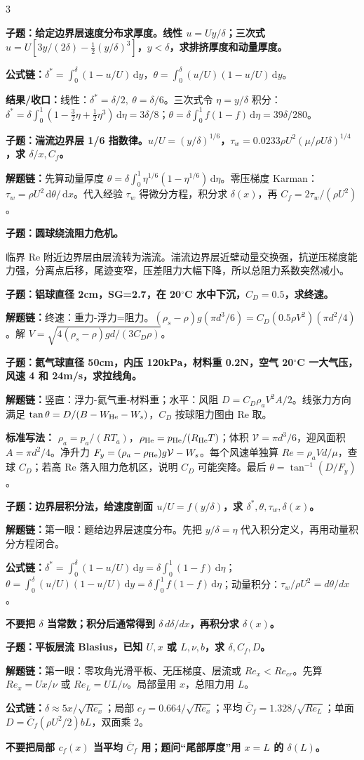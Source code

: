 \documentclass[a4paper]{article}
\newcommand{\qt}[1]{\vspace{0.04pt}\colorbox{Q}{\parbox{\dimexpr\linewidth-2\fboxsep}{\color{white}\bfseries #1}}\par}
\newcommand{\ans}[1]{\colorbox{G}{\parbox{\dimexpr\linewidth-2\fboxsep}{#1}}\par}
\newcommand{\warn}[1]{\colorbox{Y}{\parbox{\dimexpr\linewidth-2\fboxsep}{\color{E}\bfseries #1}}\par}
\newcommand{\chain}[1]{{\color{A}\bfseries 解题链：}#1\par}
\newcommand{\res}[1]{{\color{E}\bfseries 结果/收口：}#1\par}
\newcommand{\form}[1]{{\color{M}\bfseries 公式链：}#1\par}
\newcommand{\dd}{\,\mathrm d}
\begin{document}
\begin{multicols}{3}
\qt{子题：给定边界层速度分布求厚度。线性 $u=Uy/\delta$；三次式 $u=U[3y/(2\delta)-\frac12(y/\delta)^3]$，$y<\delta$，求排挤厚度和动量厚度。}
\form{$\delta^*=\int_0^\delta(1-u/U)\dd y$，$\theta=\int_0^\delta(u/U)(1-u/U)\dd y$。}
\res{线性：$\delta^*=\delta/2,\ \theta=\delta/6$。三次式令 $\eta=y/\delta$ 积分：$\delta^*=\delta\int_0^1(1-\frac32\eta+\frac12\eta^3)\dd\eta=3\delta/8$；$\theta=\delta\int_0^1 f(1-f)\dd\eta=39\delta/280$。}

\qt{子题：湍流边界层 1/6 指数律。$u/U=(y/\delta)^{1/6}$，$\tau_w=0.0233\rho U^2(\mu/\rho U\delta)^{1/4}$，求 $\delta/x,C_f$。}
\chain{先算动量厚度 $\theta=\delta\int_0^1\eta^{1/6}(1-\eta^{1/6})\dd\eta$。零压梯度 Karman：$\tau_w=\rho U^2\dd\theta/\dd x$。代入经验 $\tau_w$ 得微分方程，积分求 $\delta(x)$，再 $C_f=2\tau_w/(\rho U^2)$。}

\qt{子题：圆球绕流阻力危机。}
\ans{临界 Re 附近边界层由层流转为湍流。湍流边界层近壁动量交换强，抗逆压梯度能力强，分离点后移，尾迹变窄，压差阻力大幅下降，所以总阻力系数突然减小。}

\qt{子题：铝球直径 2cm，SG=2.7，在 20$^\circ$C 水中下沉，$C_D=0.5$，求终速。}
\chain{终速：重力-浮力=阻力。$(\rho_s-\rho)g(\pi d^3/6)=C_D(0.5\rho V^2)(\pi d^2/4)$。解 $V=\sqrt{4(\rho_s-\rho)gd/(3C_D\rho)}$。}

\qt{子题：氦气球直径 50cm，内压 120kPa，材料重 0.2N，空气 20$^\circ$C 一大气压，风速 4 和 24m/s，求拉线角。}
\chain{竖直：浮力-氦气重-材料重；水平：风阻 $D=C_D\rho_aV^2A/2$。线张力方向满足 $\tan\theta=D/(B-W_{\rm He}-W_s)$，$C_D$ 按球阻力图由 Re 取。}
\ans{\textbf{标准写法：} $\rho_a=p_a/(RT_a)$，$\rho_{\rm He}=p_{\rm He}/(R_{\rm He}T)$；体积 $\mathcal V=\pi d^3/6$，迎风面积 $A=\pi d^2/4$。净升力 $F_y=(\rho_a-\rho_{\rm He})g\mathcal V-W_s$。每个风速单独算 $Re=\rho_a Vd/\mu$，查球 $C_D$；若高 Re 落入阻力危机区，说明 $C_D$ 可能突降。最后 $\theta=\tan^{-1}(D/F_y)$。}

\qt{子题：边界层积分法，给速度剖面 $u/U=f(y/\delta)$，求 $\delta^*,\theta,\tau_w,\delta(x)$。}
\chain{第一眼：题给边界层速度分布。先把 $y/\delta=\eta$ 代入积分定义，再用动量积分方程闭合。}
\form{$\delta^*=\int_0^\delta(1-u/U)\dd y=\delta\int_0^1(1-f)\dd\eta$；$\theta=\int_0^\delta(u/U)(1-u/U)\dd y=\delta\int_0^1 f(1-f)\dd\eta$；动量积分：$\tau_w/\rho U^2=d\theta/dx$。}
\warn{不要把 $\delta$ 当常数；积分后通常得到 $\delta\,d\delta/dx$，再积分求 $\delta(x)$。}

\qt{子题：平板层流 Blasius，已知 $U,x$ 或 $L,\nu,b$，求 $\delta,C_f,D$。}
\chain{第一眼：零攻角光滑平板、无压梯度、层流或 $Re_x<Re_{cr}$。先算 $Re_x=Ux/\nu$ 或 $Re_L=UL/\nu$。局部量用 $x$，总阻力用 $L$。}
\form{$\delta\approx5x/\sqrt{Re_x}$；局部 $c_f=0.664/\sqrt{Re_x}$；平均 $\bar C_f=1.328/\sqrt{Re_L}$；单面 $D=\bar C_f(\rho U^2/2)bL$，双面乘 2。}
\warn{不要把局部 $c_f(x)$ 当平均 $\bar C_f$ 用；题问“尾部厚度”用 $x=L$ 的 $\delta(L)$。}


\end{multicols}
\end{document}
